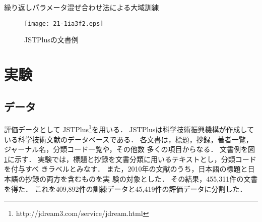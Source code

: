 \documentclass[japanese]{jnlp_1.4}
\newcommand{\vect}[1]{}
\begin{document}
\begin{algorithm}[t]
\caption{
繰り返しパラメータ混ぜ合わせ法による大域訓練}
\label{alg:ipm}
\DeclarePairedDelimiter\norm{\lVert}{\rVert}
\renewcommand{\algorithmicrequire}{}
\renewcommand{\algorithmicensure}{}
\setlength{\baselineskip}{11pt}
\end{algorithm}
\begin{figure}[t]
\begin{center}
\texttt{[image: 21-1ia3f2.eps]}
\end{center}
\caption{JSTPlusの文書例}
\label{fig:jstplus-example}
\end{figure}



\section{実験}
\label{sec:experiments}

\subsection{データ}

評価データとして
JSTPlus\footnote{http://jdream3.com/service/jdream.html}を用いる．
JSTPlusは科学技術振興機構が作成している科学技術文献のデータベースである．
各文書は，標題，抄録，著者一覧，ジャーナル名，分類コード一覧や，その他数
多くの項目からなる．
文書例を図\ref{fig:jstplus-example}に示す．
実験では，標題と抄録を文書分類に用いるテキストとし，分類コードを付与すべ
きラベルとみなす．
また，2010年の文献のうち，日本語の標題と日本語の抄録の両方を含むものを実
験の対象とした．
その結果，455,311件の文書を得た．
これを409,892件の訓練データと45,419件の評価データに分割した．
\end{document}
